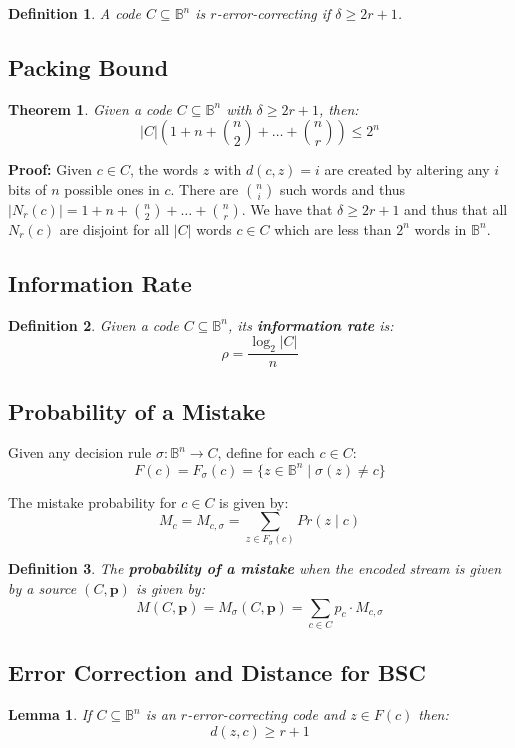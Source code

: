 \documentclass[11pt]{article}
\newtheorem{defn}{Definition}
\newtheorem{theo}{Theorem}
\newtheorem{lem}{Lemma}
\begin{document}
\begin{defn}
  A code $C \subseteq \mathbb{B}^n$ is $r$-error-correcting if $\delta \geq 2r + 1$.
\end{defn}

\subsection{Packing Bound}
\begin{theo}
  Given a code $C \subseteq \mathbb{B}^n$ with $\delta \geq 2r + 1$, then:
  \[
    \lvert C \rvert \left(1 + n + \binom{n}{2} + \ldots + \binom{n}{r}\right) \leq 2^n
  \]
\end{theo}

\textbf{Proof:}
Given $c \in C$, the words $z$ with $d(c, z) = i$ are created by altering any $i$ bits of $n$ possible ones in $c$.
There are $\binom{n}{i}$ such words and thus $\lvert N_r(c) \rvert = 1 + n + \binom{n}{2} + \ldots + \binom{n}{r}$.
We have that $\delta \geq 2r + 1$ and thus that all $N_r(c)$ are disjoint for all $\lvert C \rvert$ words $c \in C$ which are less than $2^n$ words in $\mathbb{B}^n$.

\subsection{Information Rate}
\begin{defn}
  Given a code $C \subseteq \mathbb{B}^n$, its \textbf{information rate} is:
  \[
    \rho = \frac{\log_2 \lvert C \rvert}{n}
  \]
\end{defn}

\subsection{Probability of a Mistake}
Given any decision rule $\sigma : \mathbb{B}^n \rightarrow C$, define for each $c \in C$:
\[
  F(c) = F_{\sigma}(c) = \{ z \in \mathbb{B}^n \mid \sigma(z) \neq c \}
\]

The mistake probability for $c \in C$ is given by:
\[
  M_c = M_{c, \sigma} = \sum_{z \in F_{\sigma}(c)} Pr(z \mid c)
\]

\begin{defn}
  The \textbf{probability of a mistake} when the encoded stream is given by a source $(C, \textbf{p})$ is given by:
  \[
    M(C, \textbf{p}) = M_{\sigma}(C, \textbf{p}) = \sum_{c \in C} p_c \cdot M_{c, \sigma}
  \]
\end{defn}

\subsection{Error Correction and Distance for BSC}
\begin{lem}
  If $C \subseteq \mathbb{B}^n$ is an $r$-error-correcting code and $z \in F(c)$ then:
  \[
    d(z, c) \geq r + 1
  \]
\end{lem}
\end{document}
